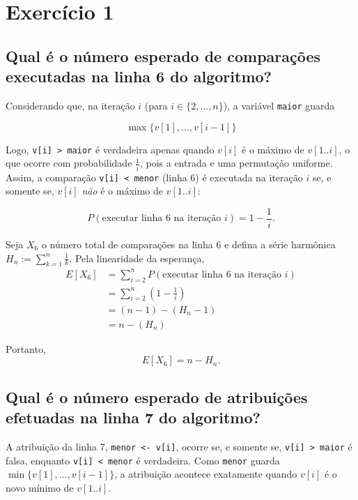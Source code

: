 \documentclass[a4paper,12pt]{article}
\begin{document}
\section*{Exercício 1}

\subsection*{Qual é o número esperado de comparações executadas na linha 6 do algoritmo?}

Considerando que, na iteração $i$ (para $i \in \{2, \dots, n\}$), a variável \texttt{maior} guarda

\begin{equation}
\max\{v[1], \dots, v[i-1]\}
\end{equation}

Logo, \texttt{v[i] > maior} é verdadeira apenas quando $v[i]$ é o máximo de $v[1..i]$, o que ocorre com probabilidade $\tfrac{1}{i}$, pois a entrada e uma permutação uniforme.
Assim, a comparação \texttt{v[i] < menor} (linha 6) é executada na iteração $i$ se, e somente se, $v[i]$ \emph{não} é o máximo de $v[1..i]$:

\begin{equation}
P(\text{executar linha 6 na iteração } i) = 1 - \frac{1}{i}.
\end{equation}

Seja $X_6$ o número total de comparações na linha 6 e defina a série harmônica $H_n := \sum_{k=1}^{n} \tfrac{1}{k}$. Pela linearidade da esperança,
\begin{align}
E[X_6]
&= \sum_{i=2}^{n} P(\text{executar linha 6 na iteração } i) \\
&= \sum_{i=2}^{n} \left(1 - \frac{1}{i}\right) \\
&= (n-1) - (H_n - 1) \\
&= n - (H_n)
\end{align}

Portanto,
\begin{equation}
\boxed{E[X_6] = n - H_n}.
\end{equation}

\subsection*{Qual é o número esperado de atribuições efetuadas na linha 7 do algoritmo?}

A atribuição da linha 7, \texttt{menor <- v[i]}, ocorre se, e somente se, \texttt{v[i] > maior} é falsa, enquanto \texttt{v[i] < menor} é verdadeira. Como \texttt{menor} guarda $\min\{v[1], \dots, v[i-1]\}$, a atribuição acontece exatamente quando $v[i]$ é o novo mínimo de $v[1..i]$.
\end{document}
